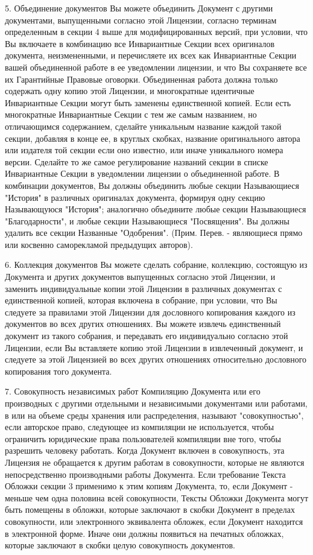 5. Объединение документов
Вы можете объединить Документ с другими документами, выпущенными согласно этой Лицензии, согласно терминам определенным
  в секции 4 выше для модифицированных версий, при условии, что Вы включаете в комбинацию все Инвариантные Секции всех
 оригиналов документа, неизмененными, и перечисляете их всех как Инвариантные Секции вашей объединенной работе в ее
 уведомлении лицензии, и что Вы сохраняете все их Гарантийные Правовые оговорки.
Объединенная работа должна только содержать одну копию этой Лицензии, и многократные идентичные Инвариантные Секции могут
 быть заменены единственной копией. Если есть многократные Инвариантные Секции с тем же самым названием, но отличающимся
 содержанием, сделайте уникальным название каждой такой секции, добавляя в конце ее, в круглых скобках, название
 оригинального автора или издателя той секции если оно известно, или иначе уникального номера версии. Сделайте то же
 самое регулирование названий секции в списке Инвариантные Секции в уведомлении лицензии о объединенной работе. 
В комбинации документов, Вы должны объединить любые секции Называющиеся "История" в различных оригиналах документа,
 формируя одну секцию Называющуюся "История"; аналогично объедините любые секции Называющиеся "Благодарности", и любые
 секции Называющиеся "Посвящения". Вы должны удалить все секции Названные "Одобрения". (Прим. Перев. - являющиеся прямо
 или косвенно саморекламой предыдущих авторов).

6. Коллекция документов
Вы можете сделать собрание, коллекцию, состоящую из Документа и других документов выпущенных согласно этой Лицензии, и
 заменить индивидуальные копии этой Лицензии в различных документах с единственной копией, которая включена в собрание,
 при условии, что Вы следуете за правилами этой Лицензии для дословного копирования каждого из документов во всех других
 отношениях.
Вы можете извлечь единственный документ из такого собрания, и передавать его индивидуально согласно этой Лицензии, если
 Вы вставляете копию этой Лицензии в извлеченный документ, и следуете за этой Лицензией во всех других отношениях
 относительно дословного копирования того документа.

7. Совокупность независимых работ
Компиляцию Документа или его производных с другими отдельными и независимыми документами или работами, в или на объеме
 среды хранения или распределения, называют "совокупностью", если авторское право, следующее из компиляции не используется,
 чтобы ограничить юридические права пользователей компиляции вне того, чтобы разрешить человеку работать. Когда Документ
 включен в совокупность, эта Лицензия не обращается к другим работам в совокупности, которые не являются непосредственно
 производными работы Документа.
Если требование Текста Обложки секции 3 применимо к этим копиям Документа, то, если Документ - меньше чем одна половина
 всей совокупности, Тексты Обложки Документа могут быть помещены в обложки, которые заключают в скобки Документ в пределах
 совокупности, или электронного эквивалента обложек, если Документ находится в электронной форме. Иначе они должны
 появиться на печатных обложках, которые заключают в скобки целую совокупность документов.

